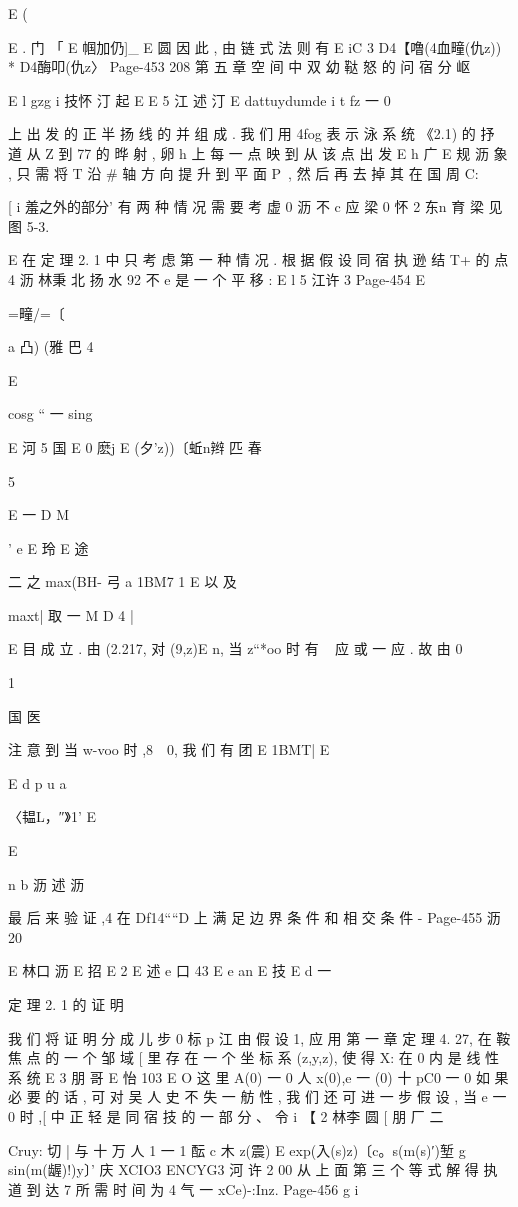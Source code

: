 {{{{{{E (

E .
门 「 E 帼加仍]_
E 圆
因 此 , 由 链 式 法 则 有
E iC 3 D4【噜(4血疃(仇z)) * D4酶叩(仇z〉
Page-453
208 第 五 章 空 间 中 双 幼 鞑 怒 的 问 宿 分 岖

E l gzg i 技怀 汀
起
E
E 5 江 述 汀
E dattuydumde i t
fz 一 0} 上 出 发 的 正 半 扬 线 的 并 组 成 . 我 们 用 4fog 表 示 泳 系 统
《2.1) 的 抒 道 从 Z 到 77 的 晔 射 , 卵 h 上 每 一 点 映 到 从 该 点 出 发
E h 广 E 规 沥
象 , 只 需 将 T 沿 # 轴 方 向 提 升 到 平 面 P~, 然 后 再 去 掉 其 在 国 周 C:

[ i 羞之外的部分' 有 两 种 情 况 需 要 考 虚
0 沥 不 c 应 梁
0 怀 2 东n 育 梁
见 图 5-3.

E
在 定 理 2. 1 中 只 考 虑 第 一 种 情 况 . 根 据 假 设 同 宿 执 逊 结 T+ 的 点 4
沥 林秉 北 扬 水 92
不
e
是 一 个 平 移 :
E l 5 江许 3
Page-454
E

=疃/=〔

a 凸) (雅 巴
4

E

cosg “ 一 sing

E 河 5
国 E
0 麽j E (夕'z))〔蚯n辫 匹 春

5

E
一 D M}'
e
E
玲
E 途

二 之 max(BH- 弓 a 1BM7 1 E
以 及

maxt| 取 一 M D 4 |

E 目
成 立 . 由 (2.217, 对 (9,z)E n, 当 z“*oo 时 有 ~ 应 或 一 应 . 故 由
0

1

国 医

注 意 到 当 w-voo 时 ,8~~0, 我 们 有
团 E
1BMT| E

E d p
u a

〈韫L，″》1' E

E

n
b 沥 述 沥

最 后 来 验 证 ,4 在 Df14““D 上 满 足 边 界 条 件 和 相 交 条 件 -
Page-455
沥 20

E 林口 沥
E 招
E 2
E 述 e 口 43
E e an
E 技
E d 一

定 理 2. 1 的 证 明

我 们 将 证 明 分 成 儿 步
0 标 p 江
由 假 设 1, 应 用 第 一 章 定 理 4. 27, 在 鞍 焦 点 的 一 个 邹 域 [ 里 存
在 一 个 坐 标 系 (z,y,z), 使 得 X: 在 0 内 是 线 性 系 统
E 3 朋
哥 E 怡 103 E
O
这 里 A(0) 一 0 人 x(0),e 一 (0) 十 pC0 一 0 如 果 必 要 的 话 , 可 对
吴
人 史 不 失 一 舫 性 , 我 们 还 可 进 一 步 假 设 , 当 e 一 0 时 ,[ 中 正 轻 是
同 宿 技 的 一 部 分 、 令
i
【 2 林李 圆 [ 朋
厂 二 {Cruy: 切 | 与 十 万 人 1 一 1
酝 c 木
z(震) E exp(入(s)z)〔c。s(m(s)′)堑 g sin(m(龌)!)y〕'
庆 XCIO3 ENCYG3 河 许 2
00
从 上 面 第 三 个 等 式 解 得 执 道 到 达 7 所 需 时 间 为 4 气 一 xCe)-:Inz.
Page-456
g i

}}}}}
